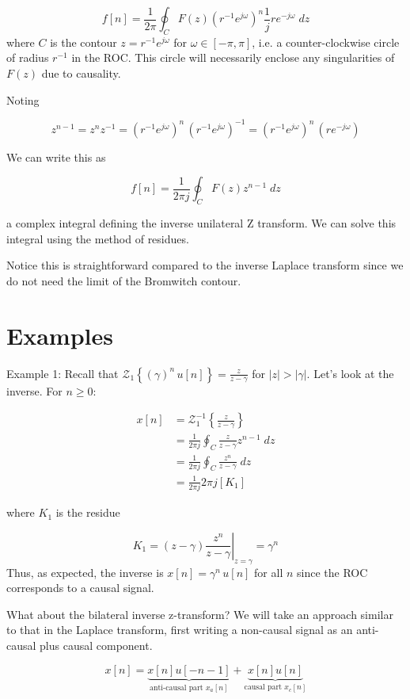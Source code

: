 \documentclass{article}
\begin{document}
$$
f[n]=\frac{1}{2 \pi} \oint_C F(z) \left(r^{-1} e^{j \omega}\right)^{n} \frac{1}{j} re^{-j\omega}\; dz
$$
where $C$ is the contour $z=r^{-1}e^{j\omega}$ for $\omega\in[-\pi, \pi]$, i.e. a counter-clockwise circle of radius $r^{-1}$ in the ROC. This circle will necessarily enclose any singularities of $F(z)$ due to causality.

Noting

$$
z^{n-1} = z^n z^{-1} = \left(r^{-1}e^{j\omega} \right)^n \, \left(r^{-1}e^{j\omega} \right)^{-1} = \left(r^{-1}e^{j\omega} \right)^n \, \left(re^{-j\omega} \right) 
$$

We can write this as

$$
f[n]= \frac{1}{2 \pi j} \oint_C F(z) z^{n-1}\; dz
$$

a complex integral defining the inverse unilateral Z transform. We can solve this integral using the method of residues.

Notice this is straightforward compared to the inverse Laplace transform since we do not need the limit of the Bromwitch contour.

\section{Examples}

Example 1: Recall that $\mathcal{Z}_1\left\{(\gamma)^n\, u[n]\right\} = \frac{z}{z-\gamma}$ for $|z| > |\gamma|$. Let's look at the inverse. For $n \geq 0$:

$$
\begin{aligned}
  x[n] &= \mathcal{Z}_1^{-1}\left\{\frac{z}{z-\gamma}\right\}\\
  &= \frac{1}{2 \pi j} \oint_C  \frac{z}{z-\gamma}  z^{n-1}\; dz\\
  &= \frac{1}{2 \pi j} \oint_C  \frac{z^n}{z-\gamma}\; dz\\
  &= \frac{1}{2 \pi j} 2 \pi j [K_1] 
\end{aligned}
$$

where $K_1$ is the residue

$$
K_1 = \left. (z-\gamma)\frac{z^n}{z-\gamma}\right|_{z = \gamma} = \gamma^n
$$
Thus, as expected, the inverse is $x[n] = \gamma^n\, u[n]$ for all $n$ since the ROC corresponds to a causal signal.

What about the bilateral inverse z-transform? We will take an approach similar to that in the Laplace transform, first writing a non-causal signal as an anti-causal plus causal component.

$$
x[n] = \underbrace{x[n] u[-n-1]}_{\text{anti-causal part } x_a[n]} +  \underbrace{x[n] u[n]}_{\text{causal part } x_c[n]} 
$$
\end{document}
